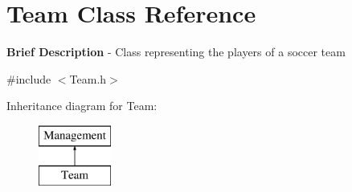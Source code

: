 \hypertarget{class_team}{\section{Team Class Reference}
\label{class_team}
}


{\bfseries Brief Description} -\/ Class representing the players of a soccer team  




{\ttfamily \#include $<$Team.\-h$>$}

Inheritance diagram for Team\-:\begin{figure}[H]
\begin{center}
\leavevmode
\includegraphics[height=2.000000cm]{class_team}
\end{center}
\end{figure}
